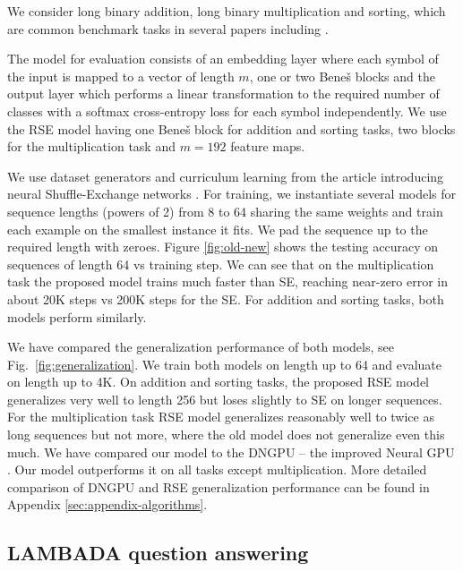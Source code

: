 \documentclass[letterpaper]{article} %
\begin{document}
We consider long binary addition, long binary multiplication and sorting, which are common benchmark tasks in several papers including \citep{shuffle-exchange, kalchbrenner2015grid, zaremba2015reinforcement,zaremba2016learning,joulin2015inferring, grefenstette2015learning, Kaiser2015NeuralGPU, freivalds2017improving, dehghani2018universal}.

The model for evaluation consists of an embedding layer where each symbol of the input is mapped to a vector of length $m$, one or two Bene\v{s} blocks and the output layer which performs a linear transformation to the required number of classes with a softmax cross-entropy loss for each symbol independently. We use the RSE model having one Bene\v{s} block for addition and sorting tasks, two blocks for the multiplication task and $m=192$ feature maps.

We use dataset generators and curriculum learning from the article introducing neural Shuffle-Exchange networks \citep{shuffle-exchange}. For training, we instantiate several models for sequence lengths (powers of 2) from 8 to 64 sharing the same weights and train each example on the smallest instance it fits. We pad the sequence up to the required length with zeroes.
Figure \ref{fig:old-new} shows the testing accuracy on sequences of length 64 vs training step. We can see that on the multiplication task the proposed model trains much faster than SE, reaching near-zero error in about 20K steps vs 200K steps for the SE. For addition and sorting tasks, both models perform similarly.

We have compared the generalization performance of both models, see Fig.~\ref{fig:generalization}. We train both models on length up to 64 and evaluate on length up to 4K. On addition and sorting tasks, the proposed RSE model generalizes very well to length 256 but loses slightly to SE on longer sequences. For the multiplication task RSE model generalizes reasonably well to twice as long sequences but not more, where the old model does not generalize even this much. We have compared our model to the DNGPU -- the improved Neural GPU \citep{freivalds2017improving}. Our model outperforms it on all tasks except multiplication. More detailed comparison of DNGPU and RSE generalization performance can be found in Appendix \ref{sec:appendix-algorithms}.

\subsection{LAMBADA question answering}
\end{document}
